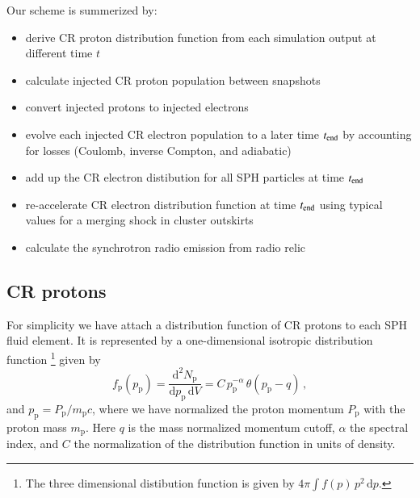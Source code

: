 \documentclass[useAMS,usenatbib]{mn2e}
\def\del#1{{}}
\newcommand{\dd}{\mathrm{d}}
\newcommand{\p}{\mathrm{p}}
\newcommand{\tend}{t_\rmn{end}}
\begin{document}
Our scheme is summerized by:
\begin{itemize}
\item derive CR proton distribution function from each simulation output at different time $t$
\item calculate injected CR proton population between snapshots 
\item convert injected protons to injected electrons
\item evolve each injected CR electron population to a later time $\tend$ by
  accounting for losses (Coulomb, inverse Compton, and adiabatic)
\item add up the CR electron distibution for all SPH particles at time $\tend$
\item re-accelerate CR electron distribution function at time $\tend$
  using typical values for a merging shock in cluster outskirts
\item calculate the synchrotron radio emission from radio relic

\end{itemize}

\subsection{CR protons}
For simplicity we have attach a distribution function of CR protons to
each SPH fluid element. It is represented by a one-dimensional
isotropic distribution function \footnote{The three dimensional
  distibution function is given by $4\pi \int f(p)\, p^2\, \dd p$.}
given by
\begin{equation}
  \label{eq:f_p}
  f_\p(p_\p) = \frac{\dd^2 N_\p}{\dd p_\p\,\dd V} = 
  C\, p_\p^{-\alpha}\,\theta(p_\p-q)\,, 
\end{equation}
and $p_\p = P_\p/m_\p c$, where we have normalized the proton momentum
$P_\p$ with the proton mass $m_\p$. Here $q$ is the mass normalized
momentum cutoff, $\alpha$ the spectral index, and $C$ the
normalization of the distribution function in units of density. 

\del{From our simulated galaxy clusters we derive for each snapshot at time
$t$ the injected CR proton distribution function $f_\p$. We select
particles in the outskirts of clusters where the gas densities are low
and hence the Coulomb cooling of the CR protons small. }
\end{document}
